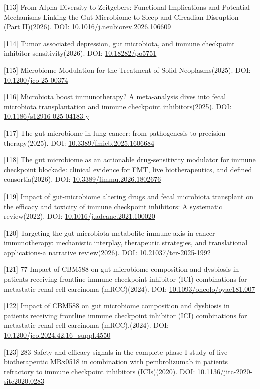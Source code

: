 {[}113{]} From Alpha Diversity to Zeitgebers: Functional Implications and Potential Mechanisms Linking the Gut Microbiome to Sleep and Circadian Disruption (Part II)(2026). DOI: \url{10.1016/j.neubiorev.2026.106609}

{[}114{]} Tumor associated depression, gut microbiota, and immune checkpoint inhibitor sensitivity(2026). DOI: \url{10.18282/po5751}

{[}115{]} Microbiome Modulation for the Treatment of Solid Neoplasms(2025). DOI: \url{10.1200/jco-25-00374}

{[}116{]} Microbiota boost immunotherapy? A meta-analysis dives into fecal microbiota transplantation and immune checkpoint inhibitors(2025). DOI: \url{10.1186/s12916-025-04183-y}

{[}117{]} The gut microbiome in lung cancer: from pathogenesis to precision therapy(2025). DOI: \url{10.3389/fmicb.2025.1606684}

{[}118{]} The gut microbiome as an actionable drug-sensitivity modulator for immune checkpoint blockade: clinical evidence for FMT, live biotherapeutics, and defined consortia(2026). DOI: \url{10.3389/fimmu.2026.1802676}

{[}119{]} Impact of gut-microbiome altering drugs and fecal microbiota transplant on the efficacy and toxicity of immune checkpoint inhibitors: A systematic review(2022). DOI: \url{10.1016/j.adcanc.2021.100020}

{[}120{]} Targeting the gut microbiota-metabolite-immune axis in cancer immunotherapy: mechanistic interplay, therapeutic strategies, and translational applications-a narrative review(2026). DOI: \url{10.21037/tcr-2025-1992}

{[}121{]} 77 Impact of CBM588 on gut microbiome composition and dysbiosis in patients receiving frontline immune checkpoint inhibitor (ICI) combinations for metastatic renal cell carcinoma (mRCC)(2024). DOI: \url{10.1093/oncolo/oyae181.007}

{[}122{]} Impact of CBM588 on gut microbiome composition and dysbiosis in patients receiving frontline immune checkpoint inhibitor (ICI) combinations for metastatic renal cell carcinoma (mRCC).(2024). DOI: \url{10.1200/jco.2024.42.16_suppl.4550}

{[}123{]} 283 Safety and efficacy signals in the complete phase I study of live biotherapeutic MRx0518 in combination with pembrolizumab in patients refractory to immune checkpoint inhibitors (ICIs)(2020). DOI: \url{10.1136/jitc-2020-sitc2020.0283}

